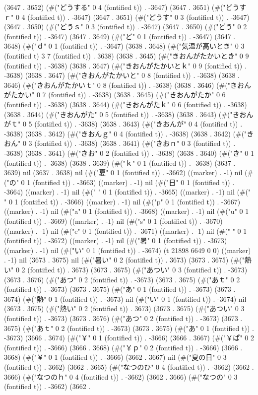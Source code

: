 (3647 . 3652) (#("どうする" 0 4 (fontified t)) . -3647) (3647 . 3651) (#("どうすｒ" 0 4 (fontified t)) . -3647) (3647 . 3651) (#("どうす" 0 3 (fontified t)) . -3647) (3647 . 3650) (#("どうｓ" 0 3 (fontified t)) . -3647) (3647 . 3650) (#("どう" 0 2 (fontified t)) . -3647) (3647 . 3649) (#("ど" 0 1 (fontified t)) . -3647) (3647 . 3648) (#("ｄ" 0 1 (fontified t)) . -3647) (3638 . 3648) (#("気温が高いとき" 0 3 (fontified t) 3 7 (fontified t)) . 3638) (3638 . 3645) (#("きおんがたかいとき" 0 9 (fontified t)) . -3638) (3638 . 3647) (#("きおんがたかいとｋ" 0 9 (fontified t)) . -3638) (3638 . 3647) (#("きおんがたかいと" 0 8 (fontified t)) . -3638) (3638 . 3646) (#("きおんがたかいｔ" 0 8 (fontified t)) . -3638) (3638 . 3646) (#("きおんがたかい" 0 7 (fontified t)) . -3638) (3638 . 3645) (#("きおんがたか" 0 6 (fontified t)) . -3638) (3638 . 3644) (#("きおんがたｋ" 0 6 (fontified t)) . -3638) (3638 . 3644) (#("きおんがた" 0 5 (fontified t)) . -3638) (3638 . 3643) (#("きおんがｔ" 0 5 (fontified t)) . -3638) (3638 . 3643) (#("きおんが" 0 4 (fontified t)) . -3638) (3638 . 3642) (#("きおんｇ" 0 4 (fontified t)) . -3638) (3638 . 3642) (#("きおん" 0 3 (fontified t)) . -3638) (3638 . 3641) (#("きおｎ" 0 3 (fontified t)) . -3638) (3638 . 3641) (#("きお" 0 2 (fontified t)) . -3638) (3638 . 3640) (#("き" 0 1 (fontified t)) . -3638) (3638 . 3639) (#("ｋ" 0 1 (fontified t)) . -3638) (3637 . 3639) nil (3637 . 3638) nil (#("夏" 0 1 (fontified t)) . -3662) ((marker) . -1) nil (#("の" 0 1 (fontified t)) . -3663) ((marker) . -1) nil (#("日" 0 1 (fontified t)) . -3664) ((marker) . -1) nil (#(" " 0 1 (fontified t)) . -3665) ((marker) . -1) nil (#("\\" 0 1 (fontified t)) . -3666) ((marker) . -1) nil (#("p" 0 1 (fontified t)) . -3667) ((marker) . -1) nil (#("a" 0 1 (fontified t)) . -3668) ((marker) . -1) nil (#("u" 0 1 (fontified t)) . -3669) ((marker) . -1) nil (#("s" 0 1 (fontified t)) . -3670) ((marker) . -1) nil (#("e" 0 1 (fontified t)) . -3671) ((marker) . -1) nil (#(" " 0 1 (fontified t)) . -3672) ((marker) . -1) nil (#("暑" 0 1 (fontified t)) . -3673) ((marker) . -1) nil (#("い" 0 1 (fontified t)) . -3674) (t 21898 6649 0 0) ((marker) . -1) nil (3673 . 3675) nil (#("暑い" 0 2 (fontified t)) . 3673) (3673 . 3675) (#("熱い" 0 2 (fontified t)) . 3673) (3673 . 3675) (#("あつい" 0 3 (fontified t)) . -3673) (3673 . 3676) (#("あつ" 0 2 (fontified t)) . -3673) (3673 . 3675) (#("あｔ" 0 2 (fontified t)) . -3673) (3673 . 3675) (#("あ" 0 1 (fontified t)) . -3673) (3673 . 3674) (#("熱" 0 1 (fontified t)) . -3673) nil (#("い" 0 1 (fontified t)) . -3674) nil (3673 . 3675) (#("熱い" 0 2 (fontified t)) . 3673) (3673 . 3675) (#("あつい" 0 3 (fontified t)) . -3673) (3673 . 3676) (#("あつ" 0 2 (fontified t)) . -3673) (3673 . 3675) (#("あｔ" 0 2 (fontified t)) . -3673) (3673 . 3675) (#("あ" 0 1 (fontified t)) . -3673) (3666 . 3674) (#("￥" 0 1 (fontified t)) . -3666) (3666 . 3667) (#("￥ぱ" 0 2 (fontified t)) . -3666) (3666 . 3668) (#("￥ｐ" 0 2 (fontified t)) . -3666) (3666 . 3668) (#("￥" 0 1 (fontified t)) . -3666) (3662 . 3667) nil (#("夏の日" 0 3 (fontified t)) . 3662) (3662 . 3665) (#("なつのひ" 0 4 (fontified t)) . -3662) (3662 . 3666) (#("なつのｈ" 0 4 (fontified t)) . -3662) (3662 . 3666) (#("なつの" 0 3 (fontified t)) . -3662) (3662 . 